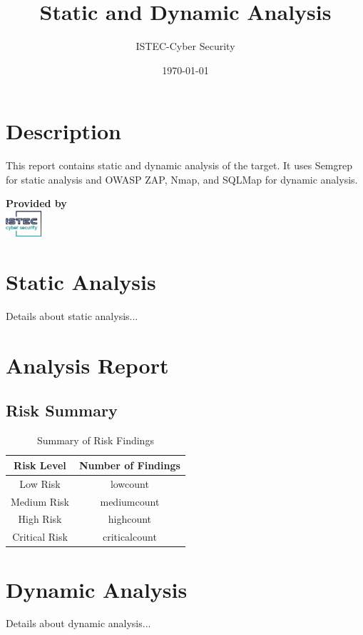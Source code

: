 \documentclass[12pt]{article}
\title{\textbf{Static and Dynamic Analysis}}
\author{ISTEC-Cyber Security}
\date{\today}  %
\begin{document}
\maketitle

\section*{Description}
This report contains static and dynamic analysis of the target. It uses Semgrep for static analysis and OWASP ZAP, Nmap, and SQLMap for dynamic analysis.

\vspace{10cm} %

\begin{center}
	\textbf{Provided by} \\[1em]
	\includegraphics[width=0.1\textwidth]{logo75.png}
\end{center}

\newpage  %

\section{Static Analysis}
Details about static analysis...

\section{Analysis Report}

\subsection{Risk Summary}
\begin{table}[h!]
    \centering
    \renewcommand{\arraystretch}{1.5}
    \begin{tabular}{|c|c|}
        \hline
        \textbf{Risk Level} & \textbf{Number of Findings} \\
        \hline
        Low Risk & lowcount \\
        \hline
        Medium Risk & mediumcount \\
        \hline
        High Risk & highcount \\
        \hline
        Critical Risk & criticalcount \\
        \hline
    \end{tabular}
    \caption{Summary of Risk Findings}
    \label{tab:risk_summary}
\end{table}

\newpage  %

\section{Dynamic Analysis}
Details about dynamic analysis...
\end{document}
